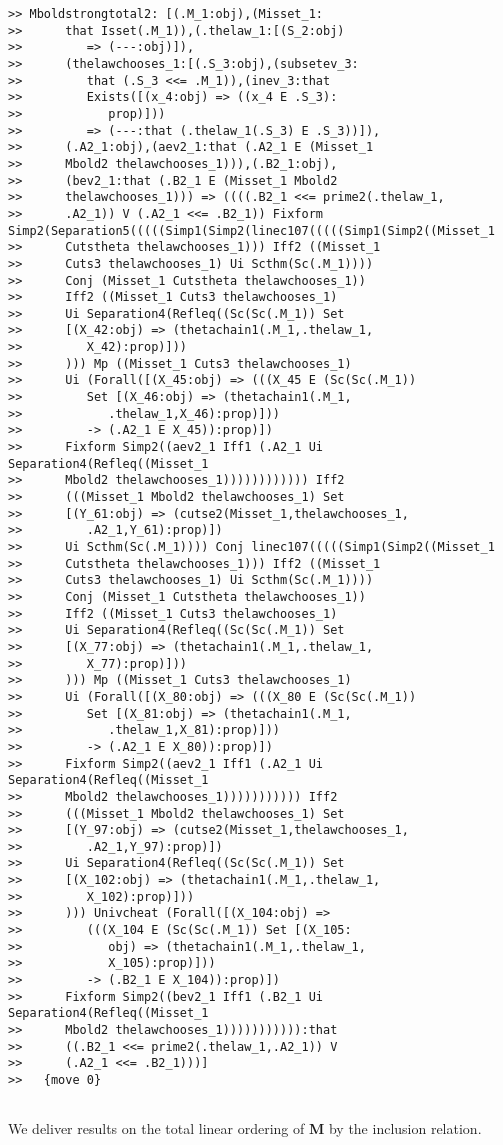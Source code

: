 \documentclass[12pt]{article}
\begin{document}
\begin{verbatim}
>> Mboldstrongtotal2: [(.M_1:obj),(Misset_1:
>>      that Isset(.M_1)),(.thelaw_1:[(S_2:obj)
>>         => (---:obj)]),
>>      (thelawchooses_1:[(.S_3:obj),(subsetev_3:
>>         that (.S_3 <<= .M_1)),(inev_3:that
>>         Exists([(x_4:obj) => ((x_4 E .S_3):
>>            prop)]))
>>         => (---:that (.thelaw_1(.S_3) E .S_3))]),
>>      (.A2_1:obj),(aev2_1:that (.A2_1 E (Misset_1
>>      Mbold2 thelawchooses_1))),(.B2_1:obj),
>>      (bev2_1:that (.B2_1 E (Misset_1 Mbold2
>>      thelawchooses_1))) => ((((.B2_1 <<= prime2(.thelaw_1,
>>      .A2_1)) V (.A2_1 <<= .B2_1)) Fixform Simp2(Separation5(((((Simp1(Simp2(linec107(((((Simp1(Simp2((Misset_1
>>      Cutstheta thelawchooses_1))) Iff2 ((Misset_1
>>      Cuts3 thelawchooses_1) Ui Scthm(Sc(.M_1))))
>>      Conj (Misset_1 Cutstheta thelawchooses_1))
>>      Iff2 ((Misset_1 Cuts3 thelawchooses_1)
>>      Ui Separation4(Refleq((Sc(Sc(.M_1)) Set
>>      [(X_42:obj) => (thetachain1(.M_1,.thelaw_1,
>>         X_42):prop)]))
>>      ))) Mp ((Misset_1 Cuts3 thelawchooses_1)
>>      Ui (Forall([(X_45:obj) => (((X_45 E (Sc(Sc(.M_1))
>>         Set [(X_46:obj) => (thetachain1(.M_1,
>>            .thelaw_1,X_46):prop)]))
>>         -> (.A2_1 E X_45)):prop)])
>>      Fixform Simp2((aev2_1 Iff1 (.A2_1 Ui Separation4(Refleq((Misset_1
>>      Mbold2 thelawchooses_1)))))))))))) Iff2
>>      (((Misset_1 Mbold2 thelawchooses_1) Set
>>      [(Y_61:obj) => (cutse2(Misset_1,thelawchooses_1,
>>         .A2_1,Y_61):prop)])
>>      Ui Scthm(Sc(.M_1)))) Conj linec107(((((Simp1(Simp2((Misset_1
>>      Cutstheta thelawchooses_1))) Iff2 ((Misset_1
>>      Cuts3 thelawchooses_1) Ui Scthm(Sc(.M_1))))
>>      Conj (Misset_1 Cutstheta thelawchooses_1))
>>      Iff2 ((Misset_1 Cuts3 thelawchooses_1)
>>      Ui Separation4(Refleq((Sc(Sc(.M_1)) Set
>>      [(X_77:obj) => (thetachain1(.M_1,.thelaw_1,
>>         X_77):prop)]))
>>      ))) Mp ((Misset_1 Cuts3 thelawchooses_1)
>>      Ui (Forall([(X_80:obj) => (((X_80 E (Sc(Sc(.M_1))
>>         Set [(X_81:obj) => (thetachain1(.M_1,
>>            .thelaw_1,X_81):prop)]))
>>         -> (.A2_1 E X_80)):prop)])
>>      Fixform Simp2((aev2_1 Iff1 (.A2_1 Ui Separation4(Refleq((Misset_1
>>      Mbold2 thelawchooses_1))))))))))) Iff2
>>      (((Misset_1 Mbold2 thelawchooses_1) Set
>>      [(Y_97:obj) => (cutse2(Misset_1,thelawchooses_1,
>>         .A2_1,Y_97):prop)])
>>      Ui Separation4(Refleq((Sc(Sc(.M_1)) Set
>>      [(X_102:obj) => (thetachain1(.M_1,.thelaw_1,
>>         X_102):prop)]))
>>      ))) Univcheat (Forall([(X_104:obj) =>
>>         (((X_104 E (Sc(Sc(.M_1)) Set [(X_105:
>>            obj) => (thetachain1(.M_1,.thelaw_1,
>>            X_105):prop)]))
>>         -> (.B2_1 E X_104)):prop)])
>>      Fixform Simp2((bev2_1 Iff1 (.B2_1 Ui Separation4(Refleq((Misset_1
>>      Mbold2 thelawchooses_1))))))))))):that
>>      ((.B2_1 <<= prime2(.thelaw_1,.A2_1)) V
>>      (.A2_1 <<= .B2_1)))]
>>   {move 0}


\end{verbatim}

We deliver results on the total linear ordering of {\bf M} by the inclusion relation.
\end{document}
